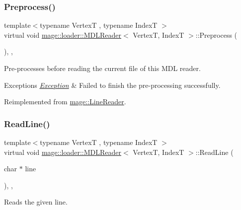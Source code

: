 \subsubsection{\texorpdfstring{Preprocess()}{Preprocess()}}
{\footnotesize\ttfamily template$<$typename VertexT , typename IndexT $>$ \\
virtual void \hyperlink{classmage_1_1loader_1_1_m_d_l_reader}{mage\+::loader\+::\+M\+D\+L\+Reader}$<$ VertexT, IndexT $>$\+::Preprocess (\begin{DoxyParamCaption}{ }\end{DoxyParamCaption})\hspace{0.3cm}{\ttfamily [override]}, {\ttfamily [private]}, {\ttfamily [virtual]}}

Pre-\/processes before reading the current file of this M\+DL reader.


\begin{DoxyExceptions}{Exceptions}
{\em \hyperlink{classmage_1_1_exception}{Exception}} & Failed to finish the pre-\/processing successfully. \\
\hline
\end{DoxyExceptions}


Reimplemented from \hyperlink{classmage_1_1_line_reader_a4de135cfb0434be786cfcfd7959031ef}{mage\+::\+Line\+Reader}.

\hypertarget{classmage_1_1loader_1_1_m_d_l_reader_ac820f425a40dcd407434fdff4d420f86}{}\label{classmage_1_1loader_1_1_m_d_l_reader_ac820f425a40dcd407434fdff4d420f86} 
\subsubsection{\texorpdfstring{Read\+Line()}{ReadLine()}}
{\footnotesize\ttfamily template$<$typename VertexT , typename IndexT $>$ \\
virtual void \hyperlink{classmage_1_1loader_1_1_m_d_l_reader}{mage\+::loader\+::\+M\+D\+L\+Reader}$<$ VertexT, IndexT $>$\+::Read\+Line (\begin{DoxyParamCaption}\item[{char $\ast$}]{line }\end{DoxyParamCaption})\hspace{0.3cm}{\ttfamily [override]}, {\ttfamily [private]}, {\ttfamily [virtual]}}

Reads the given line.

